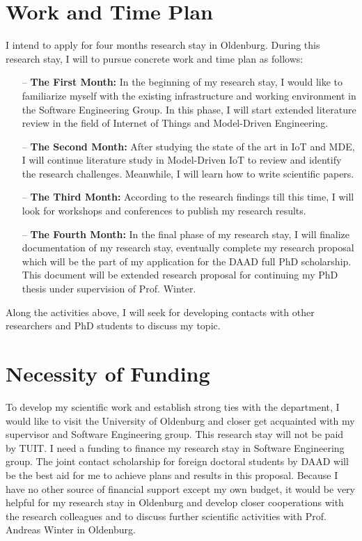 \documentclass[10pt, oneside]{article}
\begin{document}
\section{Work and Time Plan}
I intend to apply for four months research stay in Oldenburg. During this research stay, I will to pursue concrete work and time plan as follows:
\begin{itemize}
\item[--] \textbf{The First Month:} In the beginning of my research stay, I would like to familiarize myself with the existing infrastructure and working environment in the Software Engineering Group. In this phase, I will start extended literature review in the field of Internet of Things and Model-Driven Engineering.
\item[--] \textbf{The Second Month:} After studying the state of the art in IoT and MDE, I will continue literature study in Model-Driven IoT to review and identify the research challenges. Meanwhile, I will learn how to write scientific papers.
\item[--] \textbf{The Third Month:} According to the research findings till this time, I will look for workshops and conferences to publish my research results.
\item[--] \textbf{The Fourth Month:} In the final phase of my research stay, I will finalize documentation of my research stay, eventually complete my research proposal which will be the part of my application for the DAAD full PhD scholarship. This document will be extended research proposal for continuing my PhD thesis under supervision of Prof. Winter.
\end{itemize}

Along the activities above, I will seek for developing contacts with other researchers and PhD students to discuss my topic.

\section{Necessity of Funding}
To develop my scientific work and establish strong ties with the department, I would like to visit the University of Oldenburg and closer get acquainted with my supervisor and Software Engineering group. This research stay will not be paid by TUIT. I need a funding to finance my research stay in Software Engineering group. The joint contact scholarship for foreign doctoral students by DAAD will be the best aid for me to achieve plans and results in this proposal. Because I have no other source of financial support except my own budget, it would be very helpful for my research stay in Oldenburg and develop closer cooperations with the research colleagues and to discuss further scientific activities with Prof. Andreas Winter in Oldenburg.
\end{document}
